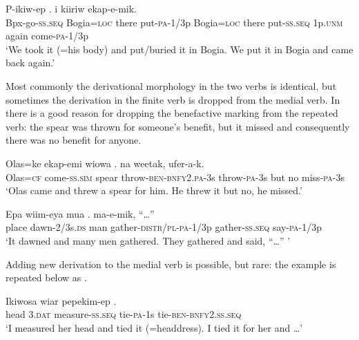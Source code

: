 \ea%
\label{ex:8:x1508}
\gll P-ikiw-ep    .      i  kiiriw  ekap-e-mik. \\
Bpx-go-\textsc{ss}.\textsc{seq} Bogia=\textsc{loc} there put-\textsc{pa}-1/3p Bogia=\textsc{loc} there  put-\textsc{ss}.\textsc{seq} 1p.\textsc{\textsc{unm}} again come-\textsc{\textsc{pa}}-1/3p     \\
\glt`We took it (=his body) and put/buried it in Bogia. We put it in Bogia and came back again.'
\z


Most commonly the derivational morphology in the two verbs is identical, but sometimes the derivation in the finite verb is dropped from the medial verb. In  there is a good reason for dropping the benefactive marking from the repeated verb: the spear was thrown for someone's benefit, but it missed and consequently there was no benefit for anyone.

\ea%
\label{ex:8:x1513}
\gll Olas=ke  ekap-emi  wiowa  .   na  weetak,  ufer-a-k. \\
Olas=\textsc{cf}  come-\textsc{ss}.\textsc{sim} spear throw-\textsc{ben}-\textsc{bnfy}2.\textsc{pa}-3s throw-\textsc{pa}-3s  but  no  miss-\textsc{pa}-3s     \\
\glt`Olas came and threw a spear for him. He threw it but no, he missed.'
\z


\ea%
\label{ex:8:x1514}
\gll Epa  wiim-eya  mua  .   ma-e-mik,  ``{\dots''}\\
place  dawn-2/3s.\textsc{ds} man  gather-\textsc{distr}/\textsc{pl}-\textsc{pa}-1/3p gather-\textsc{ss}.\textsc{seq} say-\textsc{pa}-1/3p\\
\glt`It dawned and many men gathered. They gathered and said, ``{\dots}'' '
\z


Adding new derivation to the medial verb is possible, but rare: the example  is repeated below as .

\ea%
\label{ex:8:x1515}
\gll Ikiwosa  wiar  pepekim-ep  .   \\
head  3.\textsc{dat} measure-\textsc{ss}.\textsc{seq} tie-\textsc{pa}-1s  tie-\textsc{ben}-\textsc{bnfy}2.\textsc{ss}.\textsc{seq}\\
\glt`I measured her head and tied it (=headdress). I tied it for her and {\dots}'
\z



